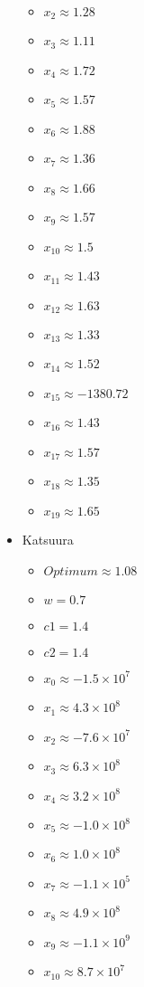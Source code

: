 \documentclass[hidelinks,english,conference]{IEEEtran}
\begin{document}
\begin{itemize}
\begin{itemize}
			\item $x_{2} \approx 1.28$
			\item $x_{3} \approx 1.11$
			\item $x_{4} \approx 1.72$
			\item $x_{5} \approx 1.57$
			\item $x_{6} \approx 1.88$
			\item $x_{7} \approx 1.36$
			\item $x_{8} \approx 1.66$
			\item $x_{9} \approx 1.57$
			\item $x_{10} \approx 1.5$
			\item $x_{11} \approx 1.43$
			\item $x_{12} \approx 1.63$
			\item $x_{13} \approx 1.33$
			\item $x_{14} \approx 1.52$
			\item $x_{15} \approx -1380.72$
			\item $x_{16} \approx 1.43$
			\item $x_{17} \approx 1.57$
			\item $x_{18} \approx 1.35$
			\item $x_{19} \approx 1.65$
		\end{itemize}
	\item Katsuura\\
		\begin{itemize}
			\item $Optimum \approx 1.08$
			\item $w = 0.7$
			\item $c1 = 1.4$
			\item $c2 = 1.4$
			\item $x_{0} \approx -1.5 \times 10^{7}$
			\item $x_{1} \approx 4.3 \times 10^{8}$
			\item $x_{2} \approx -7.6 \times 10^{7}$
			\item $x_{3} \approx 6.3 \times 10^{8}$
			\item $x_{4} \approx 3.2 \times 10^{8}$
			\item $x_{5} \approx -1.0 \times 10^{8}$
			\item $x_{6} \approx 1.0 \times 10^{8}$
			\item $x_{7} \approx -1.1 \times 10^{5}$
			\item $x_{8} \approx 4.9 \times 10^{8}$
			\item $x_{9} \approx -1.1 \times 10^{9}$
			\item $x_{10} \approx 8.7 \times 10^{7}$

\end{itemize}
\end{itemize}
\end{document}

